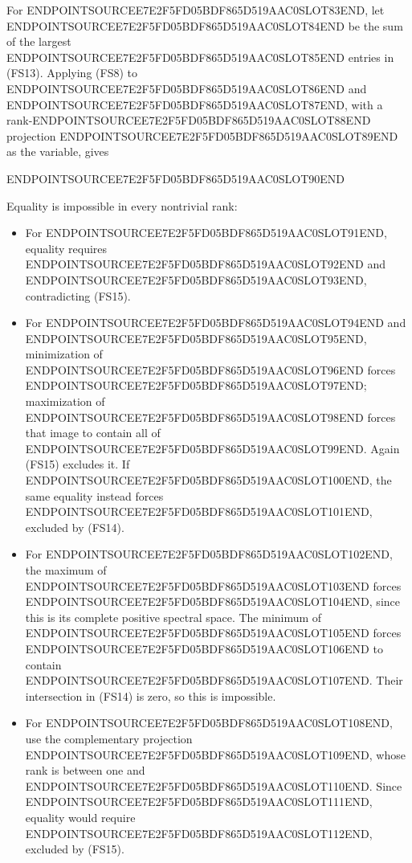 For ENDPOINTSOURCEE7E2F5FD05BDF865D519AAC0SLOT83END, let ENDPOINTSOURCEE7E2F5FD05BDF865D519AAC0SLOT84END be the sum of the largest ENDPOINTSOURCEE7E2F5FD05BDF865D519AAC0SLOT85END entries in (FS13). Applying (FS8) to ENDPOINTSOURCEE7E2F5FD05BDF865D519AAC0SLOT86END and ENDPOINTSOURCEE7E2F5FD05BDF865D519AAC0SLOT87END, with a rank-ENDPOINTSOURCEE7E2F5FD05BDF865D519AAC0SLOT88END projection ENDPOINTSOURCEE7E2F5FD05BDF865D519AAC0SLOT89END as the variable, gives

ENDPOINTSOURCEE7E2F5FD05BDF865D519AAC0SLOT90END

Equality is impossible in every nontrivial rank:

\begin{itemize}
\tightlist
\item
  For ENDPOINTSOURCEE7E2F5FD05BDF865D519AAC0SLOT91END, equality requires ENDPOINTSOURCEE7E2F5FD05BDF865D519AAC0SLOT92END and ENDPOINTSOURCEE7E2F5FD05BDF865D519AAC0SLOT93END, contradicting (FS15).
\item
  For ENDPOINTSOURCEE7E2F5FD05BDF865D519AAC0SLOT94END and ENDPOINTSOURCEE7E2F5FD05BDF865D519AAC0SLOT95END, minimization of ENDPOINTSOURCEE7E2F5FD05BDF865D519AAC0SLOT96END forces ENDPOINTSOURCEE7E2F5FD05BDF865D519AAC0SLOT97END; maximization of ENDPOINTSOURCEE7E2F5FD05BDF865D519AAC0SLOT98END forces that image to contain all of ENDPOINTSOURCEE7E2F5FD05BDF865D519AAC0SLOT99END. Again (FS15) excludes it. If ENDPOINTSOURCEE7E2F5FD05BDF865D519AAC0SLOT100END, the same equality instead forces ENDPOINTSOURCEE7E2F5FD05BDF865D519AAC0SLOT101END, excluded by (FS14).
\item
  For ENDPOINTSOURCEE7E2F5FD05BDF865D519AAC0SLOT102END, the maximum of ENDPOINTSOURCEE7E2F5FD05BDF865D519AAC0SLOT103END forces ENDPOINTSOURCEE7E2F5FD05BDF865D519AAC0SLOT104END, since this is its complete positive spectral space. The minimum of ENDPOINTSOURCEE7E2F5FD05BDF865D519AAC0SLOT105END forces ENDPOINTSOURCEE7E2F5FD05BDF865D519AAC0SLOT106END to contain ENDPOINTSOURCEE7E2F5FD05BDF865D519AAC0SLOT107END. Their intersection in (FS14) is zero, so this is impossible.
\item
  For ENDPOINTSOURCEE7E2F5FD05BDF865D519AAC0SLOT108END, use the complementary projection ENDPOINTSOURCEE7E2F5FD05BDF865D519AAC0SLOT109END, whose rank is between one and ENDPOINTSOURCEE7E2F5FD05BDF865D519AAC0SLOT110END. Since ENDPOINTSOURCEE7E2F5FD05BDF865D519AAC0SLOT111END, equality would require ENDPOINTSOURCEE7E2F5FD05BDF865D519AAC0SLOT112END, excluded by (FS15).
\end{itemize}

